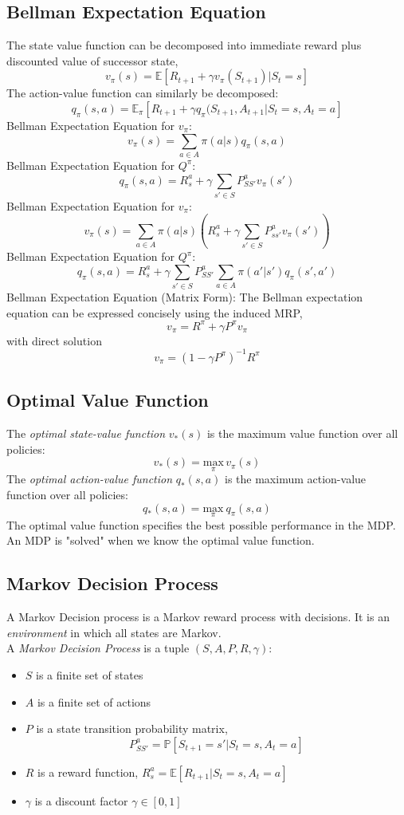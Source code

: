 \documentclass{article}
\begin{document}
\subsection{Bellman Expectation Equation}
The state value function can be decomposed into immediate reward plus discounted value of successor state,
$$v_\pi(s) = \mathbb{E}[R_{t+1} + \gamma v_\pi (S_{t+1}) | S_t = s ] $$
The action-value function can similarly be decomposed:
$$  q_\pi (s,a) = \mathbb{E}_\pi [R_{t+1} + \gamma q_\pi (S_{t+1}, A_{t+1} | S_t=s, A_t = a]  $$
Bellman Expectation Equation for $v_\pi$:
$$v_\pi (s) = \sum_{a \in A}  \pi (a|s) q_\pi (s,a) $$
Bellman Expectation Equation for $Q^\pi$:
$$ q_\pi (s,a) = R_s^a + \gamma \sum_{s' \in S} P_{SS'}^a v_\pi (s')   $$
Bellman Expectation Equation for $v_\pi$:
$$v_\pi (s) = \sum_{a \in A}  \pi (a|s) ( R_s^a + \gamma \sum_{s' \in S} P_{ss'}^a v_\pi (s')  ) $$
Bellman Expectation Equation for $Q^\pi$:
$$ q_\pi (s,a) = R_s^a + \gamma \sum_{s' \in S} P_{SS'}^a \sum_{a \in A} \pi (a'|s') q_\pi (s',a')   $$
Bellman Expectation Equation (Matrix Form):
The Bellman expectation equation can be expressed concisely using the induced MRP,
$$v_\pi = R^\pi + \gamma P^\pi v_\pi$$
with direct solution
$$ v_\pi = (1 - \gamma P^\pi)^{-1} R^\pi $$

\subsection{Optimal Value Function}
The \textit{optimal state-value function} $v_* (s) $ is the maximum value function over all policies:
$$ v_*(s) = \underset{\pi}{\mathrm{max}}\, v_\pi (s) $$
The \textit{optimal action-value function} $q_* (s,a)$ is the maximum action-value function over all policies:
$$ q_* (s,a) = \underset{\pi}{\mathrm{max}}\  q_\pi (s,a) $$
The optimal value function specifies the best possible performance in the MDP. \\
An MDP is "solved" when we know the optimal value function. 

\subsection{Markov Decision Process}
A Markov Decision process is a Markov reward process with decisions. It is an \textit{environment} in which all states are Markov. \\
A \textit{Markov Decision Process} is a tuple  $(S,A,P,R, \gamma)$:
\begin{itemize}
    \item $S$ is a finite set of states
    \item $A$ is a finite set of actions
    \item $P$ is a state transition probability matrix,
    $$ P^a_{SS'} = \mathds{P}[S_{t+1} = s' | S_t = s, A_t = a]  $$
    \item $R$ is a reward function, $ R_s^a  = \mathbb{E}[R_{t+1} | S_t = s, A_t = a]     $
    \item $\gamma$ is a discount factor $\gamma \in [0,1]$

\end{itemize}
\end{document}
